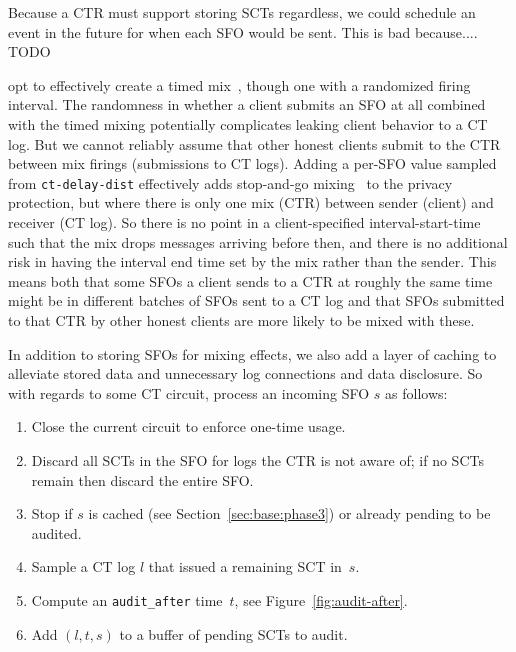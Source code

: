 Because a CTR must support storing SCTs regardless, we could schedule an event in the
future for when each SFO would be sent. This is bad because.... TODO


opt to effectively create a timed mix~\cite{trickle02}, though one with a
randomized firing interval. The randomness in whether a client submits an SFO
at all combined with the timed mixing potentially complicates leaking client
behavior to a CT log. But we cannot reliably assume that other honest
clients submit to the CTR between mix firings (submissions to CT
logs). Adding a per-SFO value sampled from \texttt{ct-delay-dist}
effectively adds stop-and-go mixing~\cite{kesdogan:ih1998} to the
privacy protection, but where there is only one mix (CTR) between
sender (client) and receiver (CT log). So there is no point in a
client-specified interval-start-time such that the mix drops messages
arriving before then, and there is no additional risk in having the
interval end time set by the mix rather than the sender. This means
both that some SFOs a client sends to a CTR at roughly the same time
might be in different batches of SFOs sent to a CT log and that SFOs
submitted to that CTR by other honest clients are more likely to be
mixed with these.


In addition to storing SFOs for mixing effects, we also add a layer of caching to
alleviate stored data and unnecessary log connections and data disclosure. So with
regards to some CT circuit, process an incoming SFO $s$ as follows:
\begin{enumerate}
    \item\label{enm:storage:close} Close the current circuit to enforce one-time
        usage.
    \item\label{enm:storage:unrecognized} Discard all SCTs in the SFO for logs the
        CTR is not aware of; if no SCTs remain then discard the entire SFO.
    \item\label{enm:storage:cached}
        Stop if $s$ is cached (see Section~\ref{sec:base:phase3}) or already
        pending to be audited.
    \item\label{enm:storage:fix-log} Sample a CT log $l$ that issued a
        remaining SCT in~$s$.
    \item\label{enm:storage:audit-after} Compute an \texttt{audit\_after}
		time~$t$, see Figure~\ref{fig:audit-after}.
    \item\label{enm:storage:store} Add $(l,t,s)$ to a buffer of pending SCTs to audit.
\end{enumerate}

